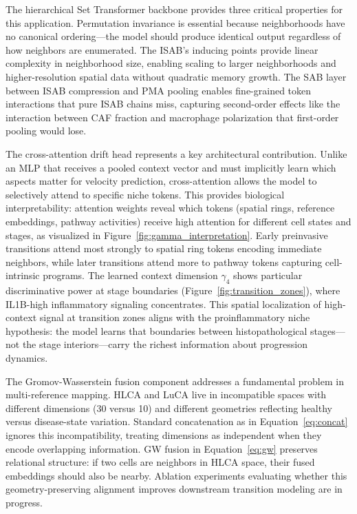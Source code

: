 \documentclass[conference]{IEEEtran}
\begin{document}
The hierarchical Set Transformer backbone provides three critical properties for this application. Permutation invariance is essential because neighborhoods have no canonical ordering---the model should produce identical output regardless of how neighbors are enumerated. The ISAB's inducing points provide linear complexity in neighborhood size, enabling scaling to larger neighborhoods and higher-resolution spatial data without quadratic memory growth. The SAB layer between ISAB compression and PMA pooling enables fine-grained token interactions that pure ISAB chains miss, capturing second-order effects like the interaction between CAF fraction and macrophage polarization that first-order pooling would lose.

The cross-attention drift head represents a key architectural contribution. Unlike an MLP that receives a pooled context vector and must implicitly learn which aspects matter for velocity prediction, cross-attention allows the model to selectively attend to specific niche tokens. This provides biological interpretability: attention weights reveal which tokens (spatial rings, reference embeddings, pathway activities) receive high attention for different cell states and stages, as visualized in Figure~\ref{fig:gamma_interpretation}. Early preinvasive transitions attend most strongly to spatial ring tokens encoding immediate neighbors, while later transitions attend more to pathway tokens capturing cell-intrinsic programs. The learned context dimension $\gamma_4$ shows particular discriminative power at stage boundaries (Figure~\ref{fig:transition_zones}), where IL1B-high inflammatory signaling concentrates. This spatial localization of high-context signal at transition zones aligns with the proinflammatory niche hypothesis: the model learns that boundaries between histopathological stages---not the stage interiors---carry the richest information about progression dynamics.

The Gromov-Wasserstein fusion component addresses a fundamental problem in multi-reference mapping. HLCA and LuCA live in incompatible spaces with different dimensions (30 versus 10) and different geometries reflecting healthy versus disease-state variation. Standard concatenation as in Equation~\ref{eq:concat} ignores this incompatibility, treating dimensions as independent when they encode overlapping information. GW fusion in Equation~\ref{eq:gw} preserves relational structure: if two cells are neighbors in HLCA space, their fused embeddings should also be nearby. Ablation experiments evaluating whether this geometry-preserving alignment improves downstream transition modeling are in progress.
\end{document}
